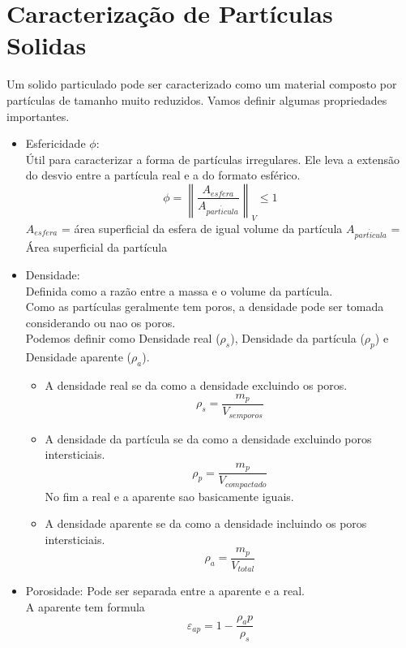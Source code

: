 \section{Caracterização de Partículas Solidas}
Um solido particulado pode ser caracterizado como um material composto por partículas de tamanho
muito reduzidos. Vamos definir algumas propriedades importantes. 
\begin{itemize}
    \item {Esfericidade \(\phi\):\\
    Útil para caracterizar a forma de partículas irregulares. Ele  leva a extensão do desvio entre a
    partícula real e a do formato esférico.\\
    \begin{equation}
        \phi = \left\lVert\frac{A_{esfera}}{A_{part \acute{i} cula}}\right\rVert_V \leq 1
    \end{equation}
    \(A_{esfera}\) = área superficial da esfera de igual volume da partícula \(A_{part \acute{i}cula}\) =
    Área superficial da partícula}
    \item {Densidade: \\
        Definida como a razão entre a massa e o volume da partícula.\\
        Como as partículas geralmente tem poros, a densidade pode ser tomada considerando ou nao os
        poros.\\
        Podemos definir como Densidade real (\(\rho_s\)), Densidade da partícula (\(\rho_p\)) e
        Densidade aparente (\(\rho_a\)).\\
        \begin{itemize}
            \item {A densidade real se da como a densidade excluindo os poros.
                \begin{equation}
                    \rho_s=\frac{m_p}{V_{sem poros}}
                \end{equation}
        }
            \item { A densidade da partícula se da como a densidade excluindo poros intersticiais.
                \begin{equation}
                    \rho_p=\frac{m_p}{V_{compactado}}
                \end{equation}
                No fim a real e a aparente sao basicamente iguais. }
            \item { A densidade aparente se da como a densidade incluindo os poros intersticiais.
                \begin{equation}
                    \rho_a=\frac{m_p}{V_{total}}
                \end{equation}
        } \end{itemize}}
        \item {Porosidade: Pode ser separada entre a aparente e a real.\\
            A aparente tem formula
            \begin{equation}
                \varepsilon_{ap} = 1 - \frac{\rho_ap}{\rho_s}
            \end{equation}

}
\end{itemize}
